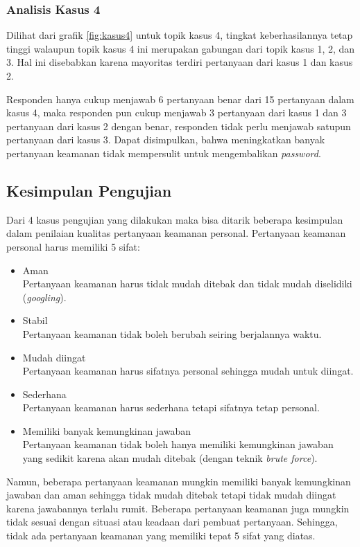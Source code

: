 \subsubsection{Analisis Kasus 4}

Dilihat dari grafik \ref{fig:kasus4} untuk topik kasus 4, tingkat keberhasilannya tetap tinggi walaupun topik kasus 4 ini merupakan gabungan dari topik kasus 1, 2, dan 3. Hal ini disebabkan karena mayoritas terdiri pertanyaan dari kasus 1 dan kasus 2.

Responden hanya cukup menjawab 6 pertanyaan benar dari 15 pertanyaan dalam kasus 4, maka responden pun cukup menjawab 3 pertanyaan dari kasus 1 dan 3 pertanyaan dari kasus 2 dengan benar, responden tidak perlu menjawab satupun pertanyaan dari kasus 3. Dapat disimpulkan, bahwa meningkatkan banyak pertanyaan keamanan tidak mempersulit untuk mengembalikan \textit{password}.

\subsection{Kesimpulan Pengujian}

Dari 4 kasus pengujian yang dilakukan maka bisa ditarik beberapa kesimpulan dalam penilaian kualitas pertanyaan keamanan personal. Pertanyaan keamanan personal harus memiliki 5 sifat:
\begin{itemize}
	\item Aman \\
	Pertanyaan keamanan harus tidak mudah ditebak dan tidak mudah diselidiki (\textit{googling}).
	\item Stabil \\
	Pertanyaan keamanan tidak boleh berubah seiring berjalannya waktu.
	\item Mudah diingat \\
	Pertanyaan keamanan harus sifatnya personal sehingga mudah untuk diingat.
	\item Sederhana \\
	Pertanyaan keamanan harus sederhana tetapi sifatnya tetap personal.
	\item Memiliki banyak kemungkinan jawaban \\
	Pertanyaan keamanan tidak boleh hanya memiliki kemungkinan jawaban yang sedikit karena akan mudah ditebak (dengan teknik \textit{brute force}).
\end{itemize}

Namun, beberapa pertanyaan keamanan mungkin memiliki banyak kemungkinan jawaban dan aman sehingga tidak mudah ditebak tetapi tidak mudah diingat karena jawabannya terlalu rumit. Beberapa pertanyaan keamanan juga mungkin tidak sesuai dengan situasi atau keadaan dari pembuat pertanyaan. Sehingga, tidak ada pertanyaan keamanan yang memiliki tepat 5 sifat yang diatas.